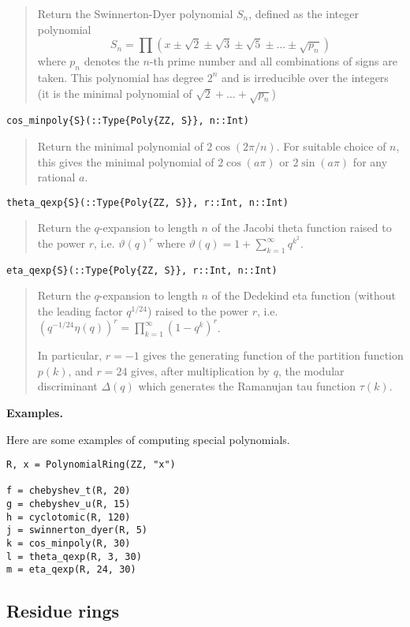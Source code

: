 \documentclass[a4paper,10pt]{article}
\newcommand{\desc}[1]{\vspace{-3mm}\begin{quote}#1\end{quote}}
\begin{document}
{{{\desc{Return the Swinnerton-Dyer polynomial $S_n$, defined as the integer 
polynomial $$S_n = \prod (x \pm \sqrt{2} \pm \sqrt{3}
\pm \sqrt{5} \pm \ldots \pm \sqrt{p_n})$$ where $p_n$ denotes the $n$-th prime 
number and all combinations of signs are taken. This polynomial has degree $2^n$
and is irreducible over the integers (it is the minimal polynomial of 
$\sqrt{2} + \ldots + \sqrt{p_n}$)}

\begin{lstlisting}
cos_minpoly{S}(::Type{Poly{ZZ, S}}, n::Int)
\end{lstlisting}

\desc{Return the minimal polynomial of $2 \cos(2 \pi / n)$. For suitable choice of 
$n$, this gives the minimal polynomial of $2 \cos(a \pi)$ or $2 \sin(a \pi)$ for any
rational $a$.}

\begin{lstlisting}
theta_qexp{S}(::Type{Poly{ZZ, S}}, r::Int, n::Int)
\end{lstlisting}

\desc{Return the $q$-expansion to length $n$ of the Jacobi theta function raised to 
the power $r$, i.e. $\vartheta(q)^r$ where 
$\vartheta(q) = 1 + \sum_{k=1}^{\infty} q^{k^2}$.}

\begin{lstlisting}
eta_qexp{S}(::Type{Poly{ZZ, S}}, r::Int, n::Int)
\end{lstlisting}

\desc{Return the $q$-expansion to length $n$ of the Dedekind eta function (without 
the leading factor $q^{1/24}$) raised to the power $r$, i.e. $(q^{-1/24} \eta(q))^r 
= \prod_{k=1}^{\infty} (1 - q^k)^r$.

In particular, $r = -1$ gives the generating function of the partition function $p(k)$, 
and $r = 24$ gives, after multiplication by $q$, the modular discriminant $\Delta(q)$ 
which generates the Ramanujan tau function $\tau(k)$.}

\textbf{Examples.}

Here are some examples of computing special polynomials.

\begin{lstlisting}
R, x = PolynomialRing(ZZ, "x")

f = chebyshev_t(R, 20)
g = chebyshev_u(R, 15)
h = cyclotomic(R, 120)
j = swinnerton_dyer(R, 5)
k = cos_minpoly(R, 30)
l = theta_qexp(R, 3, 30)
m = eta_qexp(R, 24, 30)
\end{lstlisting}

\subsection{Residue rings}

}}}
\end{document}
